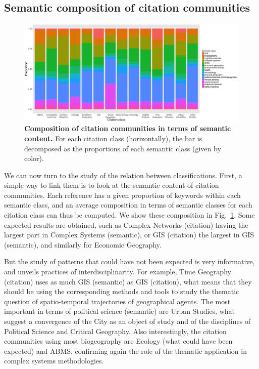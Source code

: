 \documentclass[10pt]{article}
\begin{document}
\subsection*{Semantic composition of citation communities}


\begin{figure}
\centering
\includegraphics[width=\linewidth]{Fig10.jpg}
\caption{\textbf{Composition of citation communities in terms of semantic content.} For each citation class (horizontally), the bar is decomposed as the proportions of each semantic class (given by color).}
\label{fig:citationcontent}
\end{figure}


We can now turn to the study of the relation between classifications. First, a simple way to link them is to look at the semantic content of citation communities. Each reference has a given proportion of keywords within each semantic class, and an average composition in terms of semantic classes for each citation class can thus be computed. We show these composition in Fig.~\ref{fig:citationcontent}. Some expected results are obtained, such as Complex Networks (citation) having the largest part in Complex Systems (semantic), or GIS (citation) the largest in GIS (semantic), and similarly for Economic Geography.

But the study of patterns that could have not been expected is very informative, and unveils practices of interdisciplinarity. For example, Time Geography (citation) uses as much GIS (semantic) as GIS (citation), what means that they should be using the corresponding methods and tools to study the thematic question of spatio-temporal trajectories of geographical agents. The most important in terms of political science (semantic) are Urban Studies, what suggest a convergence of the City as an object of study and of the disciplines of Political Science and Critical Geography. Also interestingly, the citation communities using most biogeography are Ecology (what could have been expected) and ABMS, confirming again the role of the thematic application in complex systems methodologies.
\end{document}
